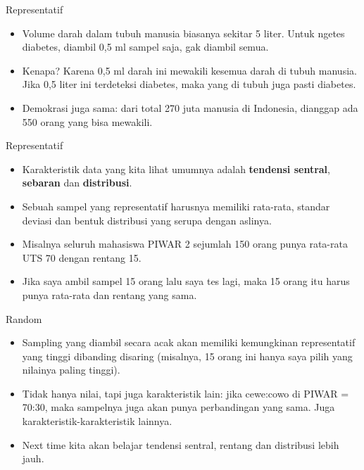 \documentclass[
  ignorenonframetext,
]{beamer}
\begin{document}
\begin{frame}{Representatif}
\label{representatif}
\begin{itemize}
\item
  Volume darah dalam tubuh manusia biasanya sekitar 5 liter. Untuk
  ngetes diabetes, diambil 0,5 ml sampel saja, gak diambil semua.
\item
  Kenapa? Karena 0,5 ml darah ini mewakili kesemua darah di tubuh
  manusia. Jika 0,5 liter ini terdeteksi diabetes, maka yang di tubuh
  juga pasti diabetes.
\item
  Demokrasi juga sama: dari total 270 juta manusia di Indonesia,
  dianggap ada 550 orang yang bisa mewakili.
\end{itemize}
\end{frame}

\begin{frame}{Representatif}
\label{representatif-1}
\begin{itemize}
\item
  Karakteristik data yang kita lihat umumnya adalah \textbf{tendensi
  sentral}, \textbf{sebaran} dan \textbf{distribusi}.
\item
  Sebuah sampel yang representatif harusnya memiliki rata-rata, standar
  deviasi dan bentuk distribusi yang serupa dengan aslinya.
\item
  Misalnya seluruh mahasiswa PIWAR 2 sejumlah 150 orang punya rata-rata
  UTS 70 dengan rentang 15.
\item
  Jika saya ambil sampel 15 orang lalu saya tes lagi, maka 15 orang itu
  harus punya rata-rata dan rentang yang sama.
\end{itemize}
\end{frame}

\begin{frame}{Random}
\label{random}
\begin{itemize}
\item
  Sampling yang diambil secara acak akan memiliki kemungkinan
  representatif yang tinggi dibanding disaring (misalnya, 15 orang ini
  hanya saya pilih yang nilainya paling tinggi).
\item
  Tidak hanya nilai, tapi juga karakteristik lain: jika cewe:cowo di
  PIWAR = 70:30, maka sampelnya juga akan punya perbandingan yang sama.
  Juga karakteristik-karakteristik lainnya.
\item
  Next time kita akan belajar tendensi sentral, rentang dan distribusi
  lebih jauh.
\end{itemize}
\end{frame}
\end{document}
